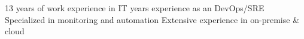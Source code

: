 \documentclass[9pt]{developercv} %
\begin{document}
\vspace{0.5cm}



\begin{minipage}[t]{0.4\textwidth} %
	\vspace{-\baselineskip} %
	13 years of work experience in IT\newline{} years experience as an DevOps/SRE\newline\newline
    Specialized in monitoring and automation\newline\newline
    Extensive experience in on-premise \& cloud\newline\newline
\end{minipage}
\hfill %
\begin{minipage}[t]{0.5\textwidth} %
	\vspace{-\baselineskip} %
	\begin{barchart}{5.5}
	\end{barchart}
\end{minipage}


\end{document}
